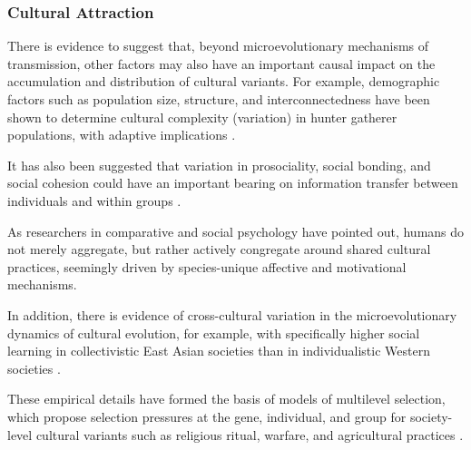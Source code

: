 \subsubsection{Cultural Attraction}
There is evidence to suggest that, beyond microevolutionary mechanisms of transmission, other factors may also have an important causal impact on the accumulation and distribution of cultural variants. For example, demographic factors such as population size, structure, and interconnectedness have been shown to determine cultural complexity (variation) in hunter gatherer populations, with adaptive implications \citep{Henrich2004}.

It has also been suggested that variation in prosociality, social bonding, and social cohesion could have an important bearing on information transfer between individuals and within groups \citep{Heyes2011,Whitehouse2014,Wheatley2016}.

As researchers in comparative and social psychology have pointed out, humans do not merely aggregate, but rather actively congregate around shared cultural practices, seemingly driven by species-unique affective and motivational mechanisms\citep{Dunbar2010,Tomasello2005a}.

In addition, there is evidence of cross-cultural variation in the microevolutionary dynamics of cultural evolution, for example, with specifically higher social learning in collectivistic East Asian societies than in individualistic Western societies \citep{Mesoudi2015,DiYanni2015}.

These empirical details have formed the basis of models of multilevel selection, which propose selection pressures at the gene, individual, and group for society-level cultural variants such as religious ritual, warfare, and agricultural practices  \citep{Turchin2013,Atkinson2011a}.


